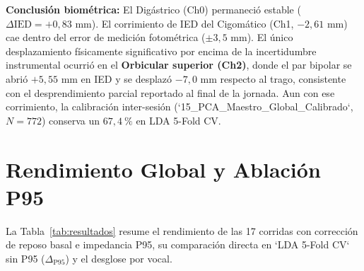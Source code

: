 \documentclass[11pt,a4paper]{article}
\begin{document}
\textbf{Conclusi\'on biom\'etrica:} El Dig\'astrico (Ch0) permaneci\'o estable ($\Delta\text{IED} = +0{,}83\text{ mm}$). El corrimiento de IED del Cigom\'atico (Ch1, $-2{,}61\text{ mm}$) cae dentro del error de medici\'on fotom\'etrica ($\pm 3{,}5\text{ mm}$). El \'unico desplazamiento f\'isicamente significativo por encima de la incertidumbre instrumental ocurri\'o en el \textbf{Orbicular superior (Ch2)}, donde el par bipolar se abri\'o $+5{,}55\text{ mm}$ en IED y se desplaz\'o $-7{,}0\text{ mm}$ respecto al trago, consistente con el desprendimiento parcial reportado al final de la jornada. Aun con ese corrimiento, la calibraci\'on inter-sesi\'on (`15\_PCA\_Maestro\_Global\_Calibrado`, $N=772$) conserva un $67{,}4\ \%$ en LDA 5-Fold CV.

\section{Rendimiento Global y Ablaci\'on P95}

La Tabla~\ref{tab:resultados} resume el rendimiento de las 17 corridas con correcci\'on de reposo basal e impedancia P95, su comparaci\'on directa en `LDA 5-Fold CV` sin P95 ($\Delta_{\text{P95}}$) y el desglose por vocal.
\end{document}
